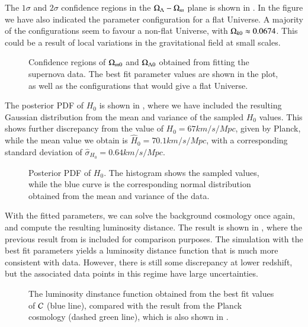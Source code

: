 The $1\sigma$ and $2\sigma$ confidence regions in the $\Omega_{\Lambda}-\Omega_{m}$ plane is shown in . In the figure we have also indicated the parameter configuration for a flat Universe. A majority of the configurations seem to favour a non-flat Universe, with $\Omega_{k0}\approx 0.0674$. This could be a result of local variations in the gravitational field at small scales.      
\begin{figure}[ht!]
    \caption{Confidence regions of $\Omega_{m0}$ and $\Omega_{\Lambda 0}$ obtained from fitting the supernova data. The best fit parameter values are shown in the plot, as well as the configurations that would give a flat Universe.}
    \label{fig:M1:results:mcmc_supernova_fit_Nburn1000}
\end{figure}

The posterior PDF of $H_0$ is shown in , where we have included the resulting Gaussian distribution from the mean and variance of the sampled $H_0$ values. This shows further discrepancy from the value of $H_0=67\unit{km/s/Mpc}$, given by Planck, while the mean value we obtain is $\hat{H}_0=70.1\unit{km/s/Mpc}$, with a corresponding standard deviation of $\hat{\sigma}_{H_0}=0.64\unit{km/s/Mpc}$.       
\begin{figure}[ht!]
    \caption{Posterior PDF of $H_0$. The histogram shows the sampled values, while the blue curve is the corresponding normal distribution obtained from the mean and variance of the data.}
    \label{fig:M1:results:H0_pdf_Nburn1000}
\end{figure}


With the fitted parameters, we can solve the background cosmology once again, and compute the resulting luminosity distance. The result is shown in , where the previous result from  is included for comparison purposes. The simulation with the best fit parameters yields a luminosity distance function that is much more consistent with data. However, there is still some discrepancy at lower redshift, but the associated data points in this regime have large uncertainties.    
\begin{figure}[ht!]
    \caption{The luminosity dinstance function obtained from the best fit values of $\mathcal{C}$ (blue line), compared with the result from the Planck cosmology (dashed green line), which is also shown in .}
    \label{fig:M1:results:dL_z_compare_fitted}
\end{figure}


